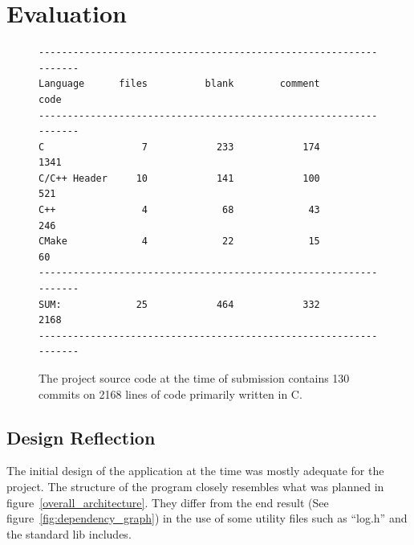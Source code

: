 \chapter{Evaluation}

\begin{figure}
\centering
\begin{verbatim}
------------------------------------------------------------------
Language      files          blank        comment           code
------------------------------------------------------------------
C                 7            233            174           1341
C/C++ Header     10            141            100            521
C++               4             68             43            246
CMake             4             22             15             60
------------------------------------------------------------------
SUM:             25            464            332           2168
------------------------------------------------------------------
\end{verbatim}
\caption[Project statistics]{The project source code at the time of submission contains 130 commits on 2168 lines of code primarily written in C.}
\label{fig:my_label}
\end{figure}

\section{Design Reflection}
The initial design of the application at the time was mostly adequate for the project. The structure of the program closely resembles what was planned in figure~\ref{overall_architecture}. They differ from the end result (See figure~\ref{fig:dependency_graph}) in the use of some utility files such as ``log.h'' and the standard lib includes. 

